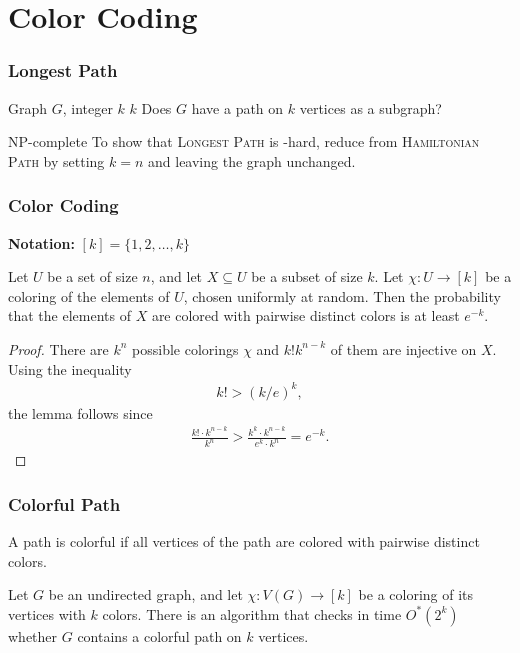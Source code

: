 \section{Color Coding}


\begin{frame}[c]\frametitle{Longest Path}
    

        {Graph $G$, integer $k$}
        {$k$}
        {Does $G$ have a path on $k$ vertices as a subgraph?}

        \pause

    \begin{block}{NP-complete}
        To show that \textsc{Longest Path} is \NP-hard, reduce from \textsc{Hamiltonian Path} by setting $k = n$ and leaving the graph unchanged.
    \end{block}

\end{frame}

\begin{frame}[c]\frametitle{Color Coding}
   
   \noindent\textbf{Notation:} $[k] = \{1,2,\dots, k\}$
    \begin{lemma}\label{lem:colorcoding}
        Let $U$ be a set of size $n$, and let $X \subseteq U$ be a subset of size $k$. Let $\chi:U \to [k]$ be a coloring of the elements of $U$, chosen uniformly at random.
        Then the probability that the elements of $X$ are colored with pairwise distinct colors is at least $e^{-k}$.
    \end{lemma} 


    \pause
    \begin{proof}
        There are $k^n$ possible colorings $\chi$ and $k! k^{n-k}$ of them are injective on $X$. Using the inequality
        \begin{align*}
           	k! > (k / e)^k,
        \end{align*}
        the lemma follows since
        \begin{align*}
           	\frac{k! \cdot k^{n-k}}{k^n} > \frac{k^k \cdot k^{n-k}}{e^k\cdot k^n} = e^{-k}.
        \end{align*}
    \end{proof}



\end{frame}

\begin{frame}[c]\frametitle{Colorful Path}
    
    A path is \alert{colorful} if all vertices of the path are colored with pairwise distinct colors.

    \begin{lemma}\label{lem:longpath}
        Let $G$ be an undirected graph, and let $\chi: V(G) \to [k]$ be a coloring of its vertices with $k$ colors. There is an algorithm that checks in time $O^*(2^k)$ whether $G$ contains a colorful path on $k$ vertices.
    \end{lemma}
\end{frame}



